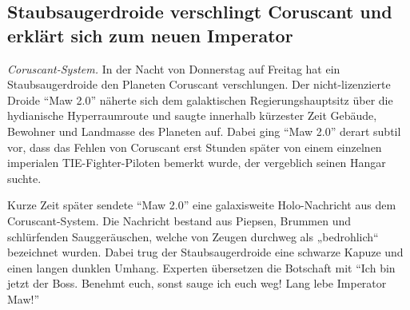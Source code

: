 \documentclass[final]{multiversum}
\begin{document}

\subsection{Staubsaugerdroide verschlingt Coruscant und erklärt sich zum neuen Imperator}

\textit{Coruscant-System.} 
In der Nacht von Donnerstag auf Freitag hat ein Staubsaugerdroide den Planeten Coruscant verschlungen. 
Der nicht-lizenzierte Droide \enquote{Maw 2.0} näherte sich dem galaktischen Regierungshauptsitz über die hydianische Hyperraumroute und saugte innerhalb kürzester Zeit Gebäude, Bewohner und Landmasse des Planeten auf. 
Dabei ging \enquote{Maw 2.0} derart subtil vor, dass das Fehlen von Coruscant erst Stunden später von einem einzelnen imperialen TIE-Fighter-Piloten bemerkt wurde, der vergeblich seinen Hangar suchte. 

Kurze Zeit später sendete \enquote{Maw 2.0} eine galaxisweite Holo-Nachricht aus dem Coruscant-System. 
Die Nachricht bestand aus Piepsen, Brummen und schlürfenden Sauggeräuschen, welche von Zeugen durchweg als „bedrohlich“ bezeichnet wurden. 
Dabei trug der Staubsaugerdroide eine schwarze Kapuze und einen langen dunklen Umhang. 
Experten übersetzen die Botschaft mit \enquote{Ich bin jetzt der Boss. 
Benehmt euch, sonst sauge ich euch weg! Lang lebe Imperator Maw!}
\end{document}
